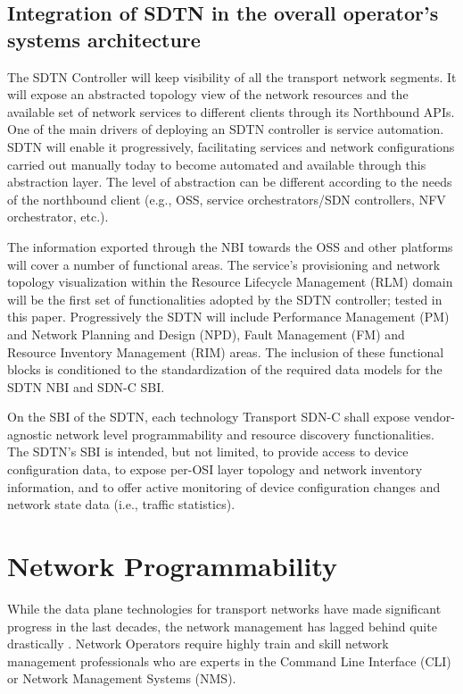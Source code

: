 \documentclass[a4paper,fleqn]{cas-dc}
\begin{document}
\subsection{Integration of SDTN in the overall operator’s systems architecture}
\label{section:sdtn}
The SDTN Controller will keep visibility of all the transport network segments. It will expose an abstracted topology view of the network resources and the available set of network services to different clients through its Northbound APIs.  
One of the main drivers of deploying an SDTN controller is service automation. SDTN will enable it progressively, facilitating services and network configurations carried out manually today to become automated and available through this abstraction layer.  The level of abstraction can be different according to the needs of the northbound client (e.g., OSS, service orchestrators/SDN controllers, NFV orchestrator, etc.). 

The information exported through the NBI towards the OSS and other platforms will cover a number of functional areas. The service’s provisioning and network topology visualization within the Resource Lifecycle Management (RLM) domain will be the first set of functionalities adopted by the SDTN controller; tested in this paper. Progressively the SDTN will include Performance Management (PM) and Network Planning and Design (NPD), Fault Management (FM) and Resource Inventory Management (RIM) areas. The inclusion of these functional blocks is conditioned to the standardization of the required data models for the SDTN NBI and SDN-C SBI.

On the SBI of the SDTN, each technology Transport SDN-C shall expose vendor-agnostic network level programmability and resource discovery functionalities. The SDTN's SBI is intended, but not limited, to provide access to device configuration data, to expose per-OSI layer topology and network inventory information, and to offer active monitoring of device configuration changes and network state data (i.e., traffic statistics). 

\section{Network Programmability}
\label{section:net}

While the data plane technologies for transport networks have made significant progress in the last decades, the network management has lagged behind quite drastically \cite{claise2019network,edelman2018network}. Network Operators require highly train and skill network management professionals who are experts in the Command Line Interface (CLI) or Network Management Systems (NMS). 
\end{document}
